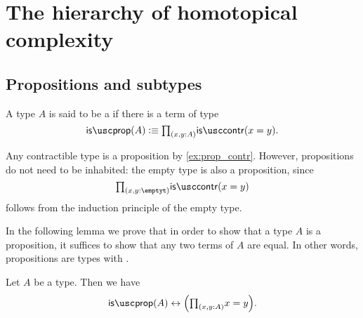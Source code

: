 
\chapter{The hierarchy of homotopical complexity}


\section{Propositions and subtypes}

\begin{defn}
A type $A$ is said to be a  if there is a term of type
\begin{equation*}
\isprop(A)\defeq\prd{x,y:A}\iscontr(x=y).
\end{equation*}
\end{defn}

\begin{eg}\label{eg:prop_contr}
Any contractible type is a proposition by \cref{ex:prop_contr}. However, propositions do not need to be inhabited: the empty type is also a proposition, since
\begin{equation*}
\prd{x,y:\emptyt}\iscontr(x=y)
\end{equation*}
follows from the induction principle of the empty type.
\end{eg}

In the following lemma we prove that in order to show that a type $A$ is a proposition, it suffices to show that any two terms of $A$ are equal. In other words, propositions are types with .

\begin{lem}\label{lem:isprop_eq}
Let $A$ be a type. Then we have
\begin{equation*}
\isprop(A)\leftrightarrow \Big(\prd{x,y:A}x=y\Big).
\end{equation*}
\end{lem}

